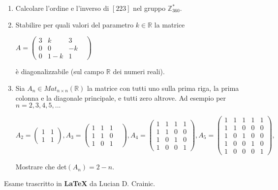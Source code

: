 \documentclass[fleqn]{article}
\begin{document}
\begin{enumerate}
    \item Calcolare l'ordine e l'inverso di $[223]$ nel gruppo $\mathbb{Z}_{360}^*$.
    
    \item Stabilire per quali valori del parametro $k \in \mathbb{R}$ la matrice 
    \begin{center}
    $A = \begin{pmatrix}
          3 & k & 3\\
          0 & 0 & -k  \\
          0 & 1-k & 1 &
       \end{pmatrix}$
    \end{center}
    è diagonalizzabile (sul campo $\mathbb{R}$ dei numeri reali).

    \item Sia $A_n \in Mat_{n \times n}(\mathbb{R})$ la matrice con tutti uno sulla prima riga, la prima colonna
    e la diagonale principale, e tutti zero altrove. Ad esempio per $n=2,3,4,5,...$
    \begin{center}
    $
    A_2 = \begin{pmatrix}
          1 & 1 \\
          1 & 1
       \end{pmatrix},
    A_3 = \begin{pmatrix}
        1 & 1 & 1\\
        1 & 1 & 0  \\
        1 & 0 & 1 &
     \end{pmatrix},
    A_4 = \begin{pmatrix}
        1 & 1 & 1 & 1\\
        1 & 1 & 0 & 0  \\
        1 & 0 & 1 & 0 \\
        1 & 0 & 0 & 1 
     \end{pmatrix},
    A_5 = \begin{pmatrix}
        1 & 1 & 1 & 1 & 1\\
        1 & 1 & 0 & 0 & 0  \\
        1 & 0 & 1 & 0 & 0 \\
        1 & 0 & 0 & 1 & 0 \\
        1 & 0 & 0 & 0 & 1
     \end{pmatrix},
    $
    \end{center}
     Mostrare che det$(A_n) = 2-n$.
\end{enumerate}
Esame trascritto in \textbf{\LaTeX} da Lucian D. Crainic.
\end{document}

